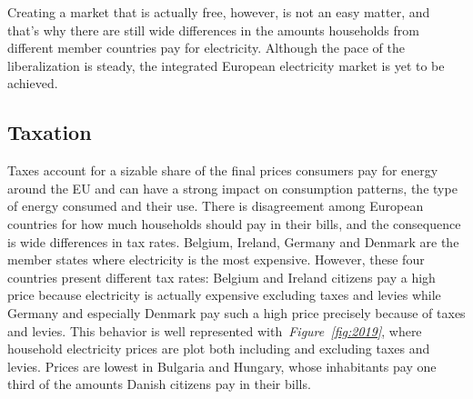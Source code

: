 \documentclass[a4paper,12pt]{book}
\begin{document}
Creating a market that is actually free, however, is not an easy matter, and that's why there are still wide differences in the amounts households from different member countries pay for electricity. Although the pace of the liberalization is steady, the integrated European electricity market is yet to be achieved.

\subsection{Taxation}

Taxes account for a sizable share of the final prices consumers pay for energy around the EU and can have a strong impact on consumption patterns, the type of energy consumed and their use. There is disagreement among European countries for how much households should pay in their bills, and the consequence is wide differences in tax rates. Belgium, Ireland, Germany and Denmark are the member states where electricity is the most expensive. However, these four countries present different tax rates: Belgium and Ireland citizens pay a high price because electricity is actually expensive excluding taxes and levies while Germany and especially Denmark pay such a high price precisely because of taxes and levies. This behavior is well represented with~\textit{Figure~\ref{fig:2019}}, where household electricity prices are plot both including and excluding taxes and levies. Prices are lowest in Bulgaria and Hungary, whose inhabitants pay one third of the amounts Danish citizens pay in their bills.
\end{document}
